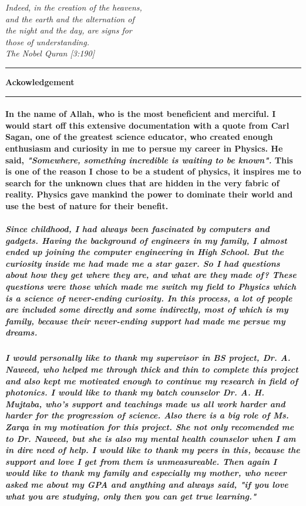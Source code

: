 \documentclass[12pt,twoside]{report}
\begin{document}

\newpage
\pagestyle{empty}
\begin{flushright}
\textit{\small{Indeed, in the creation of the heavens,\\ and the earth and the alternation of\\ the night and the day, are signs for\\ those of understanding.\\ The Nobel Quran [3:190]}}
\end{flushright}
\noindent\rule{15cm}{1pt}
\begin{flushleft}
\textbf{\Large{Ackowledgement}}
\end{flushleft}
\noindent\rule{15cm}{1pt} 
\paragraph{ \normalfont In the name of Allah, who is the most beneficient and merciful. I would start off this extensive documentation with a quote from Carl Sagan, one of the greatest science educator, who created enough enthusiasm and curiosity in me to persue my career in Physics. He said, \textit{"Somewhere, something incredible is waiting to be known".} This is one of the reason I chose to be a student of physics, it inspires me to search for the unknown clues that are hidden in the very fabric of reality. Physics gave mankind the power to dominate their world and use the best of nature for their benefit.}
\subparagraph{ \normalfont Since childhood, I had always been fascinated by computers and gadgets. Having the background of engineers in my family, I almost ended up joining the computer engineering in High School. But the curiosity inside me had made me a star gazer. So I had questions about how they get where they are, and what are they made of? These questions were those which made me switch my field to Physics which is a science of never-ending curiosity. In this process, a lot of people are included some directly and some indirectly, most of which is my family, because their never-ending support had made me persue my dreams.}
\subparagraph{ \normalfont I would personally like to thank my supervisor in BS project, Dr. A. Naweed, who helped me through thick and thin to complete this project and also kept me motivated enough to continue my research in field of photonics. I would like to thank my batch counselor Dr. A. H. Mujtaba, who's support and teachings made us all work harder and harder for the progression of science. Also there is a big role of Ms. Zarqa in my motivation for this project. She not only recomended me to Dr. Naweed, but she is also my mental health counselor when I am in dire need of help. I would like to thank my peers in this, because the support and love I get from them is unmeasureable. Then again I would like to thank my family and especially my mother, who never asked me about my GPA and anything and always said, "if you love what you are studying, only then you can get true learning."}
\end{document}
